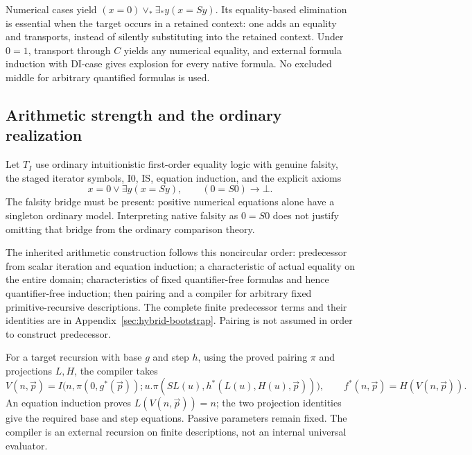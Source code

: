 Numerical cases yield
$(x=0)\vee_*\exists_*y(x=Sy)$. Its equality-based elimination is essential
when the target occurs in a retained context: one adds an equality and
transports, instead of silently substituting into the retained context.
Under $0=1$, transport through $C$ yields any numerical equality, and
external formula induction with DI-case gives explosion for every native
formula. No excluded middle for arbitrary quantified formulas is used.

\subsection{Arithmetic strength and the ordinary realization}

Let $T_I$ use ordinary intuitionistic first-order equality logic with
genuine falsity, the staged iterator symbols, I0, IS, equation induction,
and the explicit axioms
\[
 x=0\vee\exists y(x=Sy),\qquad (0=S0)\to\bot.
\]
The falsity bridge must be present: positive numerical equations alone
have a singleton ordinary model. Interpreting native falsity as $0=S0$
does not justify omitting that bridge from the ordinary comparison theory.

The inherited arithmetic construction follows this noncircular order:
predecessor from scalar iteration and equation induction; a characteristic
of actual equality on the entire domain; characteristics of fixed
quantifier-free formulas and hence quantifier-free induction; then pairing
and a compiler for arbitrary fixed primitive-recursive descriptions.
The complete finite predecessor terms and their identities are in
Appendix~\ref{sec:hybrid-bootstrap}. Pairing is not assumed in order to
construct predecessor.

For a target recursion with base $g$ and step $h$, using the proved pairing
$\pi$ and projections $L,H$, the compiler takes
\[
 V(n,\vec p)=I\bigl(n,\pi(0,g^*(\vec p));
 u.\pi(SL(u),h^*(L(u),H(u),\vec p))\bigr),
 \qquad f^*(n,\vec p)=H(V(n,\vec p)).
\]
An equation induction proves $L(V(n,\vec p))=n$; the two projection
identities give the required base and step equations. Passive parameters
remain fixed. The compiler is an external recursion on finite descriptions,
not an internal universal evaluator.

